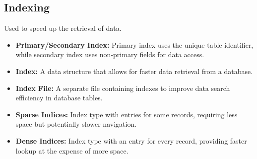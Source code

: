\vspace{-0.3cm}
\subsection*{Indexing}
\vspace{-0.1cm}

\noindent
Used to speed up the retrieval of data.

\begin{itemize}[noitemsep,leftmargin=*] 
\leftskip-\dimexpr\leftmargin %
\item[]{\textbf{Primary/Secondary Index:} Primary index uses the unique table identifier, while secondary index uses non-primary fields for data access.}
\item[]{\textbf{Index:} A data structure that allows for faster data retrieval from a database.}
\item[]{\textbf{Index File:} A separate file containing indexes to improve data search efficiency in database tables.}
\item[]{\textbf{Sparse Indices:} Index type with entries for some records, requiring less space but potentially slower navigation.}
\item[]{\textbf{Dense Indices:} Index type with an entry for every record, providing faster lookup at the expense of more space.}
\end{itemize}
